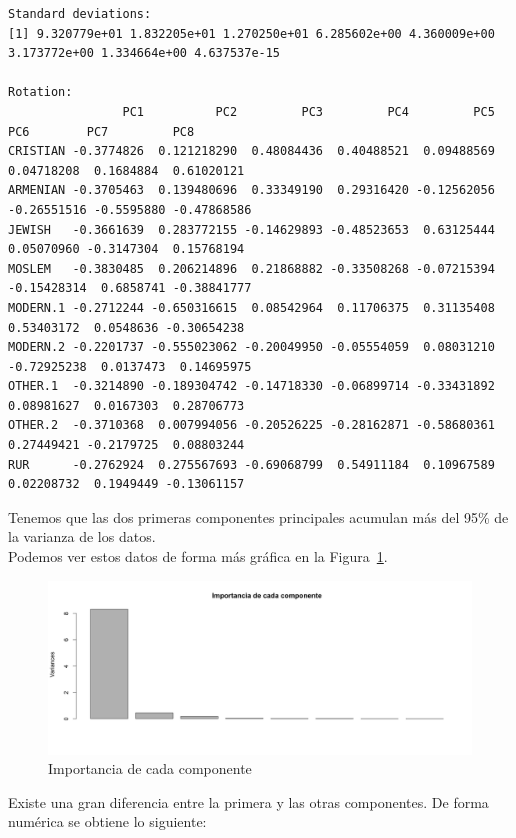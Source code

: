 \documentclass[12pt,a4paper,twoside,openright,titlepage,final]{article}
\begin{document}
\begin{Verbatim}[fontsize=\scriptsize]
Standard deviations:
[1] 9.320779e+01 1.832205e+01 1.270250e+01 6.285602e+00 4.360009e+00 3.173772e+00 1.334664e+00 4.637537e-15

Rotation:
                PC1          PC2         PC3         PC4         PC5         PC6        PC7         PC8
CRISTIAN -0.3774826  0.121218290  0.48084436  0.40488521  0.09488569  0.04718208  0.1684884  0.61020121
ARMENIAN -0.3705463  0.139480696  0.33349190  0.29316420 -0.12562056 -0.26551516 -0.5595880 -0.47868586
JEWISH   -0.3661639  0.283772155 -0.14629893 -0.48523653  0.63125444  0.05070960 -0.3147304  0.15768194
MOSLEM   -0.3830485  0.206214896  0.21868882 -0.33508268 -0.07215394 -0.15428314  0.6858741 -0.38841777
MODERN.1 -0.2712244 -0.650316615  0.08542964  0.11706375  0.31135408  0.53403172  0.0548636 -0.30654238
MODERN.2 -0.2201737 -0.555023062 -0.20049950 -0.05554059  0.08031210 -0.72925238  0.0137473  0.14695975
OTHER.1  -0.3214890 -0.189304742 -0.14718330 -0.06899714 -0.33431892  0.08981627  0.0167303  0.28706773
OTHER.2  -0.3710368  0.007994056 -0.20526225 -0.28162871 -0.58680361  0.27449421 -0.2179725  0.08803244
RUR      -0.2762924  0.275567693 -0.69068799  0.54911184  0.10967589  0.02208732  0.1949449 -0.13061157
\end{Verbatim}

Tenemos que las dos primeras componentes principales acumulan más del 95\% de la varianza de los datos.\\

Podemos ver estos datos de forma más gráfica en la Figura~\ref{fig:varianza_pca}.\\

\begin{figure}[tbph!]
\centering
\includegraphics[width=0.8\linewidth]{imagenes/varianza_pca}
\caption{Importancia de cada componente}
\label{fig:varianza_pca}
\end{figure}

Existe una gran diferencia entre la primera y las otras componentes. De forma numérica se obtiene lo siguiente:
\end{document}
